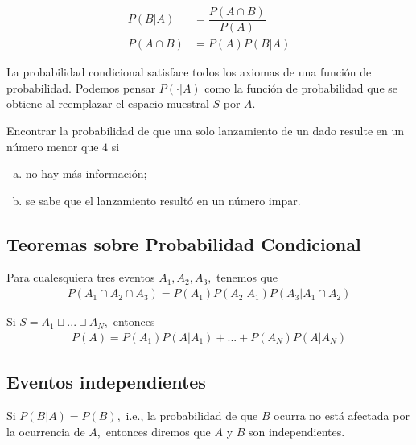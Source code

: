 \begin{defn}
 \begin{align}
  P(B|A)&=\dfrac{P(A\cap B)}{P(A)} \\
  P(A\cap B) &= P(A)P(B|A)
 \end{align}
\end{defn}


{}
\begin{rem}
 La probabilidad condicional satisface todos los axiomas de una función de probabilidad.  Podemos pensar $P(\cdot|A)$ como la función de probabilidad que se obtiene al reemplazar el espacio muestral $S$ por $A.$
\end{rem}


{}
\begin{ejemplo}
 \label{exmp:0.1.13}
 Encontrar la probabilidad de que una solo lanzamiento de un dado resulte en un número menor que $4$ si
 \begin{enumerate}[(a)]
  \item no hay más información; 
  \item se sabe que el lanzamiento resultó en un número impar.
 \end{enumerate}

\end{ejemplo}


\subsection{Teoremas sobre Probabilidad Condicional}
{}
\begin{thm}
 \label{thm:0.1.9}
 Para cualesquiera tres eventos $A_{1},A_{2},A_{3},$ tenemos que
 \begin{align}
  \label{eq:0.1.19}
  P(A_{1} \cap A_{2} \cap A_{3})=P(A_{1})P(A_{2}|A_{1})P(A_{3}|A_{1} \cap A_{2})
 \end{align}
\end{thm}


{}
\begin{thm}
 \label{thm:0.1.10} Si $S=A_{1}\sqcup ... \sqcup A_{N},$  entonces
 \begin{align}
\label{eq:0.1.20}
P(A)=P(A_{1})P(A|A_{1})+...+P(A_{N})P(A|A_{N})
\end{align}
\end{thm}


\subsection{Eventos independientes}
{}
Si $P(B|A)=P(B),$ i.e., la probabilidad de que $B$ ocurra no está afectada por la ocurrencia de $A,$ entonces diremos que $A$ y $B$ son independientes.


